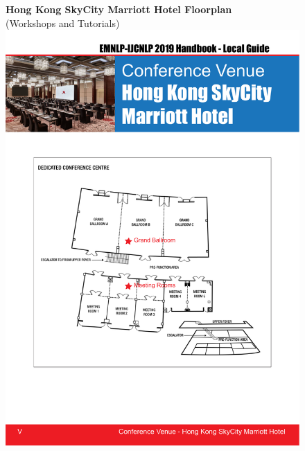 \begin{figure}[p]
\centering
\textbf{Hong Kong SkyCity Marriott Hotel Floorplan}\\
(Workshops and Tutorials)
\vspace{10em}
\includegraphics[width=\textwidth]{content/fmatter/Marriott_map.pdf}
\end{figure}
